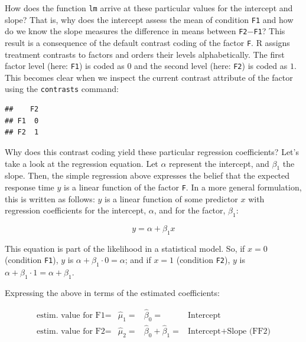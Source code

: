 \documentclass[
  12pt,
]{krantz}
\newenvironment{Shaded}{\begin{snugshade}}{\end{snugshade}}
\newcommand{\FunctionTok}[1]{\textcolor[rgb]{0.00,0.00,0.00}{#1}}
\newcommand{\NormalTok}[1]{#1}
\newcommand{\SpecialCharTok}[1]{\textcolor[rgb]{0.00,0.00,0.00}{#1}}
\theoremstyle{definition}
\theoremstyle{definition}
\theoremstyle{definition}
\theoremstyle{definition}
\theoremstyle{remark}
\begin{document}
How does the function \texttt{lm} arrive at these particular values for the intercept and slope? That is, why does the intercept assess the mean of condition \texttt{F1} and how do we know the slope measures the difference in means between \texttt{F2}\(-\)\texttt{F1}? This result is a consequence of the default contrast coding of the factor \texttt{F}. R assigns treatment contrasts to factors and orders their levels alphabetically. The first factor level (here: \texttt{F1}) is coded as \(0\) and the second level (here: \texttt{F2}) is coded as \(1\). This becomes clear when we inspect the current contrast attribute of the factor using the \texttt{contrasts} command:

\begin{Shaded}
\end{Shaded}

\begin{verbatim}
##    F2
## F1  0
## F2  1
\end{verbatim}

Why does this contrast coding yield these particular regression coefficients? Let's take a look at the regression equation.
Let \(\alpha\) represent the intercept, and \(\beta_1\) the slope. Then, the simple regression above expresses the belief that the expected response time \(y\) is a linear function of the factor \texttt{F}. In a more general formulation, this is written as follows: \(y\) is a linear function of some predictor \(x\) with regression coefficients for the intercept, \(\alpha\), and for the factor, \(\beta_1\):

\begin{equation}
y = \alpha + \beta_1x
\label{eq:lm1}
\end{equation}

This equation is part of the likelihood in a statistical model.
So, if \(x = 0\) (condition \texttt{F1}), \(y\) is \(\alpha + \beta_1 \cdot 0 = \alpha\); and if \(x = 1\) (condition \texttt{F2}), \(y\) is \(\alpha + \beta_1 \cdot 1 = \alpha + \beta_1\).

Expressing the above in terms of the estimated coefficients:

\begin{equation}
\begin{array}{lccll}
\text{estim. value for F1} = & \hat{\mu}_1 = & \hat{\beta}_0 = & \text{Intercept} \\
\text{estim. value for F2} = & \hat{\mu}_2 = & \hat{\beta}_0 + \hat{\beta}_1 = & \text{Intercept} + \text{Slope (FF2)}
\end{array}
\label{eq:predVal}
\end{equation}
\end{document}
